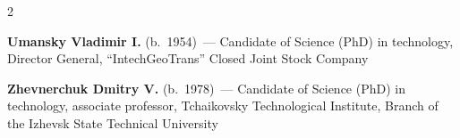 \begin{multicols}{2}
\vspace*{6pt}

\noindent
\textbf{Umansky Vladimir I.} (b.\ 1954)~--- Candidate of Science (PhD) in technology, 
Director General, ``IntechGeoTrans'' Closed Joint Stock Company

\vspace*{6pt}

\noindent
\textbf{Zhevnerchuk Dmitry V.} (b.\ 1978)~--- Candidate of Science (PhD) in technology, 
associate professor, Tchaikovsky Technological Institute, Branch of the Izhevsk State 
Technical University


\def\leftfootline{\small{\textbf{\thepage}
\hfill ����������� � �� ����������\ \ \ ⮬~6\ \ \ ����~2\ \ \ 2012}
}%
 \def\rightfootline{\small{����������� � �� ����������\ \ \ ⮬~6\ \ \ ����~2\ \ \ 2012
\hfill \textbf{\thepage}}}




\end{multicols}
\newpage

